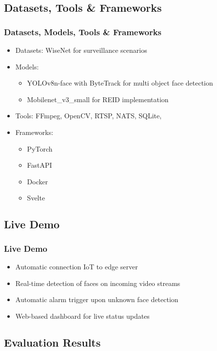 \documentclass[11pt,t,usepdftitle=false,aspectratio=169]{beamer}
\begin{document}
\subsection{Datasets, Tools \& Frameworks}

\begin{frame}
	\frametitle{Datasets, Models, Tools \& Frameworks}
	\begin{itemize}
		\item Datasets: WiseNet for surveillance scenarios
		\item Models:
		      \begin{itemize}
			      \item YOLOv8n-face with ByteTrack for multi object face detection
			      \item Mobilenet\_v3\_small for REID implementation
		      \end{itemize}
		\item Tools: FFmpeg, OpenCV, RTSP, NATS, SQLite,
		\item Frameworks: 
		\begin{itemize}
			\item PyTorch 
			\item FastAPI
			\item Docker
			\item Svelte  
		\end{itemize}
	\end{itemize}
\end{frame}

\subsection{Live Demo}

\begin{frame}
	\frametitle{Live Demo}
	\begin{itemize}
		\item Automatic connection IoT to edge server
		\item Real-time detection of faces on incoming video streams
		\item Automatic alarm trigger upon unknown face detection
		\item Web-based dashboard for live status updates
	\end{itemize}
\end{frame}

\subsection{Evaluation Results}
\end{document}
